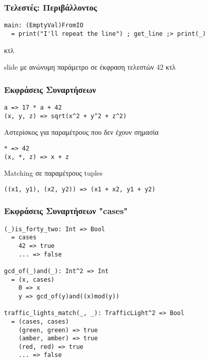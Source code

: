 \documentclass{beamer}
\def\e{\foreignlanguage{english}}
\begin{document}
\begin{frame}[fragile]

\frametitle{Τελεστές: Περιβάλλοντος}

\begin{otherlanguage}{english}
\begin{verbatim}
main: (EmptyVal)FromIO
  = print("I'll repeat the line") ; get_line ;> print(_)
\end{verbatim}
\end{otherlanguage}
κτλ

slide με ανώνυμη παράμετρο σε έκφραση τελεστών 42 κτλ
\end{frame}

\begin{frame}[fragile]

\frametitle{Εκφράσεις Συναρτήσεων}

\begin{otherlanguage}{english}
\begin{verbatim}
a => 17 * a + 42
(x, y, z) => sqrt(x^2 + y^2 + z^2)
\end{verbatim}
\end{otherlanguage}
Αστερίσκος για παραμέτρους που δεν έχουν σημασία
\begin{otherlanguage}{english}
\begin{verbatim}
* => 42
(x, *, z) => x + z
\end{verbatim}
\end{otherlanguage}
\e{Matching} σε παραμέτρους \e{tuples}
\begin{otherlanguage}{english}
\begin{verbatim}
((x1, y1), (x2, y2)) => (x1 + x2, y1 + y2)
\end{verbatim}
\end{otherlanguage}

\end{frame}

\begin{frame}[fragile]

\frametitle{Εκφράσεις Συναρτήσεων \e{"cases"}}

\begin{otherlanguage}{english}
\begin{verbatim}
(_)is_forty_two: Int => Bool
  = cases
    42 => true
    ... => false

gcd_of(_)and(_): Int^2 => Int
  = (x, cases)
    0 => x
    y => gcd_of(y)and((x)mod(y))

traffic_lights_match(_, _): TrafficLight^2 => Bool
  = (cases, cases)
    (green, green) => true
    (amber, amber) => true
    (red, red) => true
    ... => false
\end{verbatim}
\end{otherlanguage}

\end{frame}
\end{document}
